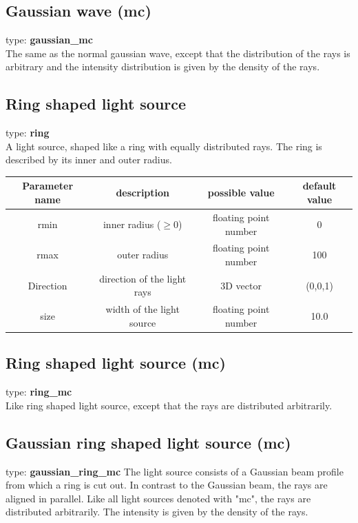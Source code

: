 \documentclass[a4paper,html,11pt,openany]{book}
\begin{document}
\subsection{Gaussian wave (mc)} 
 type: \textbf{gaussian\_mc} \\
The same as the normal gaussian wave, except that the distribution of the rays is arbitrary and the intensity distribution is given by the density of the rays. 

\subsection{Ring shaped light source}
type: \textbf{ring} \\
A light source, shaped like a ring with equally distributed rays. The ring is described by its inner and outer radius. 

\vspace{1em}
 \begin{tabular}{c|c|c|c}
 Parameter name & description  & possible value & default value\\
 \hline
  rmin & inner radius ($\ge 0$) & floating point number & 0 \\
  \hline
  rmax & outer radius  & floating point number & 100 \\
  \hline 
  Direction & direction of the light rays & 3D vector & (0,0,1) \\
    \hline
  size & width of the light source  & floating point number & 10.0\\

\end{tabular} 
 
\subsection{Ring shaped light source (mc)}
 type: \textbf{ring\_mc} \\
Like ring shaped light source, except that the rays are distributed arbitrarily. 
 \subsection{Gaussian ring shaped light source (mc)}
type: \textbf{gaussian\_ring\_mc}
The light source consists of a Gaussian beam profile from which a ring is cut out. In contrast to the Gaussian beam, the rays are aligned in parallel.
Like all light sources denoted with "mc", the rays are distributed arbitrarily. The intensity is given by the density of the rays. 
\end{document}
